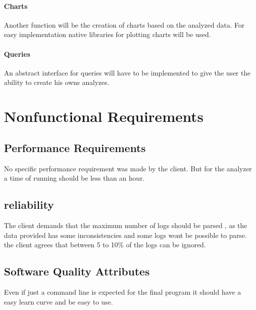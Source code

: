 \documentclass{scrreprt}
\begin{document}
\subsubsection{Charts}
Another function will be the creation of charts based on the analyzed data.
For easy implementation native libraries for plotting charts will be used.

\subsubsection{Queries}
An abstract interface for queries will have to be implemented to give the user
the ability to create his owns analyzes.





\chapter{Nonfunctional Requirements}

\section{Performance Requirements}
No specific performance requirement was made by the client. But for the analyzer
a time of running should be less than an hour.



\section{reliability}
The client demands that the maximum number of logs should be parsed , as the
data provided has some inconsistencies and some logs wont be possible to parse.
the client agrees that between  5 to 10\% of the logs can be ignored.


\section{Software Quality Attributes}
Even if just a command line is expected for the final program it should have a
easy learn curve and be easy to use.
\end{document}
